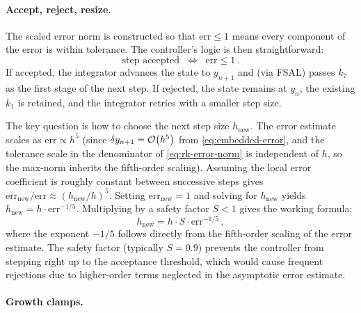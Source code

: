 \paragraph{Accept, reject, resize.}

The scaled error norm is constructed so that $\mathrm{err} \leq 1$
means every component of the error is within tolerance.  The
controller's logic is then straightforward:
%
\begin{equation}
  \text{step accepted} \;\;\Longleftrightarrow\;\; \mathrm{err} \leq 1 \,.
  \label{eq:rk-accept}
\end{equation}
%
If accepted, the integrator advances the state to $y_{n+1}$ and
(via FSAL) passes $k_7$ as the first stage of the next step.  If
rejected, the state remains at $y_n$, the existing $k_1$ is retained,
and the integrator retries with a smaller step size.

The key question is how to choose the next step size $h_{\text{new}}$.
The error estimate scales as $\mathrm{err} \propto h^5$ (since
$\delta y_{n+1} = \mathcal{O}\!\left(h^5\right)$ from \cref{eq:embedded-error}, and the
tolerance scale in the denominator of \cref{eq:rk-error-norm} is
independent of $h$, so the max-norm inherits the fifth-order scaling).
Assuming the local error coefficient is roughly constant between
successive steps gives
$\mathrm{err}_{\text{new}} / \mathrm{err}
  \approx (h_{\text{new}} / h)^5$.
Setting $\mathrm{err}_{\text{new}} = 1$ and solving for
$h_{\text{new}}$ yields
$h_{\text{new}} = h \cdot \mathrm{err}^{-1/5}$.
Multiplying by a safety factor $S < 1$ gives the working formula:
%
\begin{equation}
  h_{\text{new}} = h \cdot S \cdot \mathrm{err}^{-1/5} \,,
  \label{eq:rk-step-control}
\end{equation}
%
where the exponent $-1/5$ follows directly from the fifth-order scaling
of the error estimate.  The safety factor (typically $S = 0.9$)
prevents the controller from stepping right up to the acceptance
threshold, which would cause frequent rejections due to higher-order
terms neglected in the asymptotic error estimate.

\paragraph{Growth clamps.}

